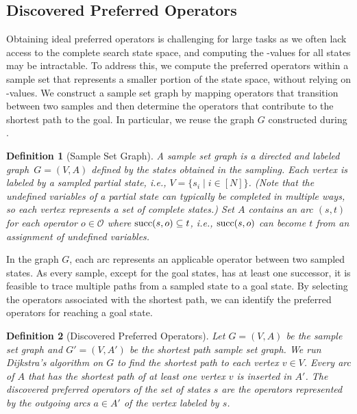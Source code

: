 \documentclass[ppgc,diss,english]{iiufrgs}
\newtheorem{definition}{Definition}
\begin{document}
\subsection{Discovered Preferred Operators}
\label{sec:sample-discovered-po}
Obtaining ideal preferred operators is challenging for large tasks as we often lack access to the complete search state space, and computing the \hstar-values for all states may be intractable. To address this, we compute the preferred operators within a sample set that represents a smaller portion of the state space, without relying on \hstar-values. We construct a sample set graph by mapping operators that transition between two samples and then determine the operators that contribute to the shortest path to the goal. In particular, we reuse the graph $G$ constructed during \sui.

\begin{definition}[Sample Set Graph]\label{def:graph}
A sample set graph is a directed and labeled graph~$G = (V, A)$ defined by the states obtained in the sampling. Each vertex is labeled by a sampled partial state, i.e., $V = \{s_i \mid i \in [N]\}$. (Note that the undefined variables of a partial state can typically be completed in multiple ways, so each vertex represents a set of complete states.) Set $A$ contains an arc $(s,t)$ for each operator $o \in \mathcal{O}$ where $\operatorname{succ}(s,o) \subseteq t$, i.e., $\operatorname{succ}(s,o)$ can become $t$ from an assignment of undefined variables.
\end{definition}

In the graph $G$, each arc represents an applicable operator between two sampled states. As every sample, except for the goal states, has at least one successor, it is feasible to trace multiple paths from a sampled state to a goal state. By selecting the operators associated with the shortest path, we can identify the preferred operators for reaching a goal state.

\begin{definition}[Discovered Preferred Operators]\label{def:discovered_preferred_operators}
Let $G = (V, A)$ be the sample set graph and $G' = (V, A')$ be the shortest path sample set graph. We run Dijkstra's algorithm on $G$ to find the shortest path to each vertex $v \in V$. Every arc of $A$ that has the shortest path of at least one vertex $v$ is inserted in $A'$. The discovered preferred operators of the set of states $s$ are the operators represented by the outgoing arcs $a \in A'$ of the vertex labeled by $s$.
\end{definition}
\end{document}
